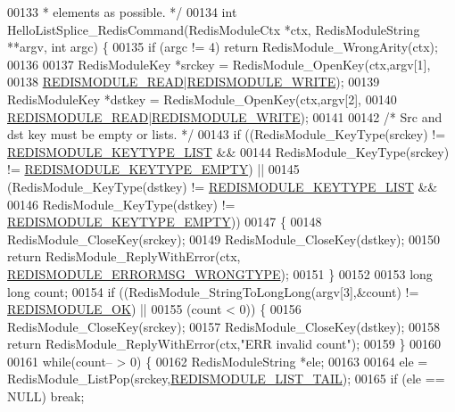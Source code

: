 \begin{DoxyCode}
00133 \textcolor{comment}{ * elements as possible. */}
00134 \textcolor{keywordtype}{int} HelloListSplice\_RedisCommand(RedisModuleCtx *ctx, RedisModuleString **argv, \textcolor{keywordtype}{int} argc) \{
00135     \textcolor{keywordflow}{if} (argc != 4) \textcolor{keywordflow}{return} RedisModule\_WrongArity(ctx);
00136 
00137     RedisModuleKey *srckey = RedisModule\_OpenKey(ctx,argv[1],
00138         \hyperlink{redismodule_8h_a369d2ff4bca768b05f826a12dd694825}{REDISMODULE\_READ}|\hyperlink{redismodule_8h_a73b37117ef94cb4a904361afcc51b6b4}{REDISMODULE\_WRITE});
00139     RedisModuleKey *dstkey = RedisModule\_OpenKey(ctx,argv[2],
00140         \hyperlink{redismodule_8h_a369d2ff4bca768b05f826a12dd694825}{REDISMODULE\_READ}|\hyperlink{redismodule_8h_a73b37117ef94cb4a904361afcc51b6b4}{REDISMODULE\_WRITE});
00141 
00142     \textcolor{comment}{/* Src and dst key must be empty or lists. */}
00143     \textcolor{keywordflow}{if} ((RedisModule\_KeyType(srckey) != \hyperlink{redismodule_8h_a4c01058971d9d8fe1cfa02071fa87fa6}{REDISMODULE\_KEYTYPE\_LIST} &&
00144          RedisModule\_KeyType(srckey) != \hyperlink{redismodule_8h_adf2819748eb5e89c621d2c9c65c0b5f7}{REDISMODULE\_KEYTYPE\_EMPTY}) ||
00145         (RedisModule\_KeyType(dstkey) != \hyperlink{redismodule_8h_a4c01058971d9d8fe1cfa02071fa87fa6}{REDISMODULE\_KEYTYPE\_LIST} &&
00146          RedisModule\_KeyType(dstkey) != \hyperlink{redismodule_8h_adf2819748eb5e89c621d2c9c65c0b5f7}{REDISMODULE\_KEYTYPE\_EMPTY}))
00147     \{
00148         RedisModule\_CloseKey(srckey);
00149         RedisModule\_CloseKey(dstkey);
00150         \textcolor{keywordflow}{return} RedisModule\_ReplyWithError(ctx,
      \hyperlink{redismodule_8h_ab897689b0673a1e4cbc097cb5bce04c1}{REDISMODULE\_ERRORMSG\_WRONGTYPE});
00151     \}
00152 
00153     \textcolor{keywordtype}{long} \textcolor{keywordtype}{long} count;
00154     \textcolor{keywordflow}{if} ((RedisModule\_StringToLongLong(argv[3],&count) != \hyperlink{redismodule_8h_a1bc5bfd69abcd378ff52c640adc5418d}{REDISMODULE\_OK}) ||
00155         (count < 0)) \{
00156         RedisModule\_CloseKey(srckey);
00157         RedisModule\_CloseKey(dstkey);
00158         \textcolor{keywordflow}{return} RedisModule\_ReplyWithError(ctx,\textcolor{stringliteral}{"ERR invalid count"});
00159     \}
00160 
00161     \textcolor{keywordflow}{while}(count-- > 0) \{
00162         RedisModuleString *ele;
00163 
00164         ele = RedisModule\_ListPop(srckey,\hyperlink{redismodule_8h_a15271c33eee2d766df968558d1e0357c}{REDISMODULE\_LIST\_TAIL});
00165         \textcolor{keywordflow}{if} (ele == NULL) \textcolor{keywordflow}{break};

\end{DoxyCode}
